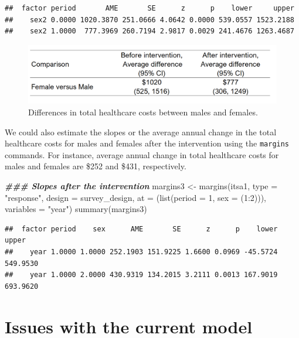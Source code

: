\documentclass[
]{book}
\newenvironment{Shaded}{\begin{snugshade}}{\end{snugshade}}
\newcommand{\AttributeTok}[1]{\textcolor[rgb]{0.77,0.63,0.00}{#1}}
\newcommand{\DecValTok}[1]{\textcolor[rgb]{0.00,0.00,0.81}{#1}}
\newcommand{\DocumentationTok}[1]{\textcolor[rgb]{0.56,0.35,0.01}{\textbf{\textit{#1}}}}
\newcommand{\FunctionTok}[1]{\textcolor[rgb]{0.00,0.00,0.00}{#1}}
\newcommand{\NormalTok}[1]{#1}
\newcommand{\OtherTok}[1]{\textcolor[rgb]{0.56,0.35,0.01}{#1}}
\newcommand{\SpecialCharTok}[1]{\textcolor[rgb]{0.00,0.00,0.00}{#1}}
\newcommand{\StringTok}[1]{\textcolor[rgb]{0.31,0.60,0.02}{#1}}
\begin{document}
\begin{verbatim}
##  factor period       AME       SE      z      p    lower     upper
##    sex2 0.0000 1020.3870 251.0666 4.0642 0.0000 539.0557 1523.2188
##    sex2 1.0000  777.3969 260.7194 2.9817 0.0029 241.4676 1263.4687
\end{verbatim}

\begin{figure}
\includegraphics[width=1\linewidth]{Figure 6_2} \caption{Differences in total healthcare costs between males and females.}\label{fig:unnamed-chunk-91}
\end{figure}

We could also estimate the slopes or the average annual change in the total healthcare costs for males and females after the intervention using the \texttt{margins} commands. For instance, average annual change in total healthcare costs for males and females are \$252 and \$431, respectively.

\begin{Shaded}
\begin{Highlighting}[]
\DocumentationTok{\#\#\# Slopes after the intervention}
\NormalTok{margins3 }\OtherTok{\textless{}{-}} \FunctionTok{margins}\NormalTok{(itsa1, }\AttributeTok{type =} \StringTok{"response"}\NormalTok{, }\AttributeTok{design =}\NormalTok{ survey\_design, }\AttributeTok{at =}\NormalTok{ (}\FunctionTok{list}\NormalTok{(}\AttributeTok{period =} \DecValTok{1}\NormalTok{, }\AttributeTok{sex =}\NormalTok{ (}\DecValTok{1}\SpecialCharTok{:}\DecValTok{2}\NormalTok{))), }\AttributeTok{variables =} \StringTok{"year"}\NormalTok{)}
\FunctionTok{summary}\NormalTok{(margins3)}
\end{Highlighting}
\end{Shaded}

\begin{verbatim}
##  factor period    sex      AME       SE      z      p    lower    upper
##    year 1.0000 1.0000 252.1903 151.9225 1.6600 0.0969 -45.5724 549.9530
##    year 1.0000 2.0000 430.9319 134.2015 3.2111 0.0013 167.9019 693.9620
\end{verbatim}

\hypertarget{issues-with-the-current-model}{%
\section{Issues with the current model}\label{issues-with-the-current-model}}
\end{document}
